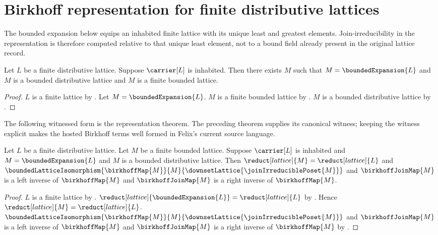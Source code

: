 \section{Birkhoff representation for finite distributive lattices}




The bounded expansion below equips an inhabited finite lattice with its
unique least and greatest elements.  Join-irreducibility in the representation
is therefore computed relative to that unique least element, not to a bound
field already present in the original lattice record.

\begin{theorem}\label{finite_distributive_lattice_has_bounded_expansion}
    Let $L$ be a finite distributive lattice.
    Suppose $\carrier[L]$ is inhabited.
    Then there exists $M$ such that
        $M=\boundedExpansion{L}$ and
        $M$ is a bounded distributive lattice and
        $M$ is a finite bounded lattice.
\end{theorem}
\begin{proof}
    $L$ is a finite lattice by .
    Let $M=\boundedExpansion{L}$.
    $M$ is a finite bounded lattice by
        .
    $M$ is a bounded distributive lattice by
        .
\end{proof}

The following witnessed form is the representation theorem.  The preceding
theorem supplies its canonical witness; keeping the witness explicit makes
the hosted Birkhoff terms well formed in Felix's current source language.

\begin{theorem}\label{finite_distributive_lattice_birkhoff_representation}
    Let $L$ be a finite distributive lattice.
    Let $M$ be a finite bounded lattice.
    Suppose $\carrier[L]$ is inhabited and
        $M=\boundedExpansion{L}$ and
        $M$ is a bounded distributive lattice.
    Then $\reduct[lattice]{M}=\reduct[lattice]{L}$ and
        $\boundedLatticeIsomorphism
            {\birkhoffMap{M}}{M}
            {\downsetLattice{\joinIrreduciblePoset{M}}}$ and
        $\birkhoffJoinMap{M}$ is a left inverse of $\birkhoffMap{M}$ and
        $\birkhoffJoinMap{M}$ is a right inverse of $\birkhoffMap{M}$.
\end{theorem}
\begin{proof}
    $L$ is a finite lattice by .
    $\reduct[lattice]{\boundedExpansion{L}}
        =\reduct[lattice]{L}$ by
        .
    Hence $\reduct[lattice]{M}=\reduct[lattice]{L}$.
    $\boundedLatticeIsomorphism
        {\birkhoffMap{M}}{M}
        {\downsetLattice{\joinIrreduciblePoset{M}}}$ and
        $\birkhoffJoinMap{M}$ is a left inverse of $\birkhoffMap{M}$ and
        $\birkhoffJoinMap{M}$ is a right inverse of $\birkhoffMap{M}$ by
        .
\end{proof}


